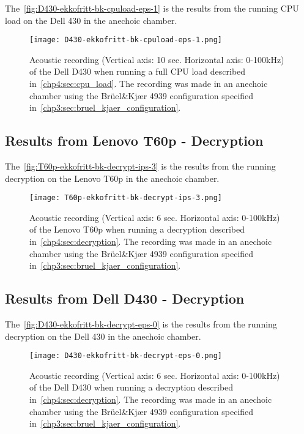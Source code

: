The~\autoref{fig:D430-ekkofritt-bk-cpuload-eps-1} is the results from the running CPU load on the Dell 430 in the anechoic chamber. 
\begin{figure}[ht]
    \centering
    \texttt{[image: D430-ekkofritt-bk-cpuload-eps-1.png]}
    \caption{Acoustic recording (Vertical axis: 10 sec. Horizontal axis: 0-100kHz) of the Dell D430 when running a full CPU load described in~\autoref{chp4:sec:cpu_load}. The recording was made in an anechoic chamber using the Brüel\&Kjær 4939 configuration specified in~\autoref{chp3:sec:bruel_kjaer_configuration}. }
    \label{fig:D430-ekkofritt-bk-cpuload-eps-1}
\end{figure}


\subsection{Results from Lenovo T60p - Decryption}\label{chp5:subsec:t60p_bk_results_decryption}

The~\autoref{fig:T60p-ekkofritt-bk-decrypt-ips-3} is the results from the running decryption on the Lenovo T60p in the anechoic chamber. 
\begin{figure}[ht]
    \centering
    \texttt{[image: T60p-ekkofritt-bk-decrypt-ips-3.png]}
    \caption{Acoustic recording (Vertical axis: 6 sec. Horizontal axis: 0-100kHz) of the Lenovo T60p when running a decryption described in~\autoref{chp4:sec:decryption}. The recording was made in an anechoic chamber using the Brüel\&Kjær 4939 configuration specified in~\autoref{chp3:sec:bruel_kjaer_configuration}. }
    \label{fig:T60p-ekkofritt-bk-decrypt-ips-3}
\end{figure}

\subsection{Results from Dell D430 - Decryption}\label{chp5:subsec:d430_bk_results_cpuload}

The~\autoref{fig:D430-ekkofritt-bk-decrypt-eps-0} is the results from the running decryption on the Dell 430 in the anechoic chamber. 
\begin{figure}[ht]
    \centering
    \texttt{[image: D430-ekkofritt-bk-decrypt-eps-0.png]}
    \caption{Acoustic recording (Vertical axis: 6 sec. Horizontal axis: 0-100kHz) of the Dell D430 when running a decryption described in~\autoref{chp4:sec:decryption}. The recording was made in an anechoic chamber using the Brüel\&Kjær 4939 configuration specified in~\autoref{chp3:sec:bruel_kjaer_configuration}.}
    \label{fig:D430-ekkofritt-bk-decrypt-eps-0}
\end{figure}


